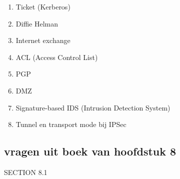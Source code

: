 \begin{enumerate}
\begin{enumerate}

        \item Ticket (Kerberos)


        \item Diffie Helman


        \item Internet exchange



        \item ACL (Access Control List)


        \item PGP


        \item DMZ


        \item Signature-based IDS (Intrusion Detection System)


        \item Tunnel en transport mode bij IPSec
        

    \end{enumerate} %
    
  \end{enumerate} %
  
\subsection{vragen uit boek van hoofdstuk 8}

\noindent SECTION 8.1

